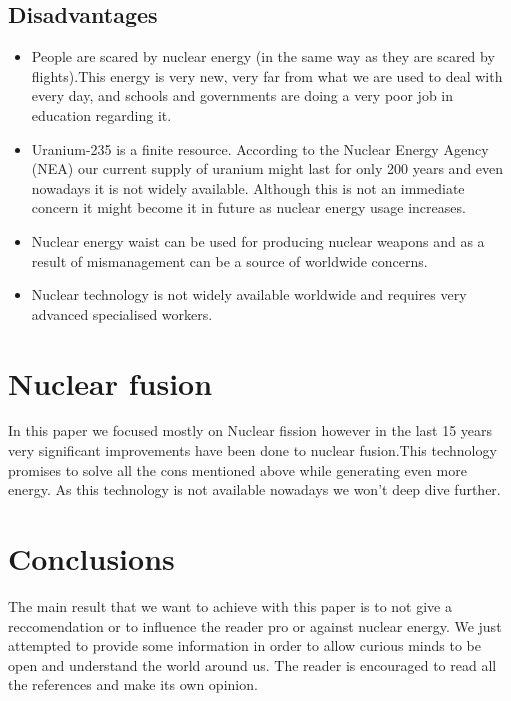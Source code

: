 \documentclass{article}
\begin{document}
\subsection{Disadvantages}
\begin{itemize}
    \item People are scared by nuclear energy (in the same way as they are scared by flights).This energy is very new, very far from what we are used to deal with every day,  and schools and governments are doing a very poor job in education regarding it.

    \item Uranium-235 is a finite resource. According to the Nuclear Energy Agency (NEA) our current supply of uranium might last for only 200 years and even nowadays it is not widely available. Although this is not an immediate concern it might become it in future as nuclear energy usage increases.
    \item Nuclear energy waist can be used for producing nuclear weapons and as a result of mismanagement can be a source of worldwide concerns.
    \item Nuclear technology is not widely available worldwide and requires very advanced specialised workers.
    
\end{itemize}
\section{Nuclear fusion}
In this paper we focused mostly on Nuclear fission however in the last 15 years very significant improvements have been done to nuclear fusion.This technology promises to solve all the cons mentioned above while generating even more energy. As this technology is not available nowadays we won't deep dive further.

\section{Conclusions}

The main result that we want to achieve with this paper is to not give a reccomendation or to influence the reader pro or against nuclear energy. We just attempted to provide some information in order to allow curious minds to be open and understand the world around us. The reader is encouraged to read all the references and make its own opinion.
\end{document}
